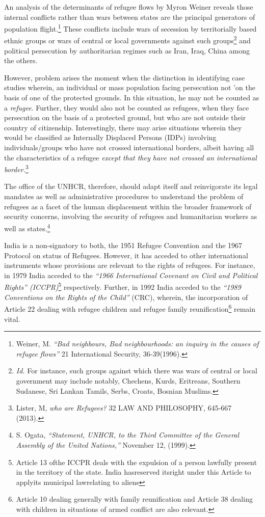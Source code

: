 \begin{multicols}{2}
\noi
An analysis of the determinants of refugee flows by Myron Weiner reveals those internal
conflicts rather than wars between states are the principal generators of population
flight.\footnote{Weiner, M. \textit{“Bad neighbours, Bad neighbourhoods: an inquiry in the causes of refugee flows”} 21
International Security, 36-39(1996).} These conflicts include wars of secession by territorially based ethnic groups or wars
of central or local governments against such groups\footnote{\textit{Id.} For instance, such groups against which there was wars of central or local government may include notably, Chechens, Kurds, Eritreans, Southern Sudanese, Sri Lankan Tamils, Serbs, Croats, Bosnian Muslims. } and political persecution by authoritarian regimes such as Iran, Iraq, China among the others.

\noi
However, problem arises the moment when the distinction in identifying case studies wherein,
an individual or mass population facing persecution not 'on the basis of one of the protected
grounds. In this situation, he may not be counted as a \textit{refugee}. Further, they would also not be
counted as refugees, when they face persecution on the basis of a protected ground, but who
are not outside their country of citizenship. Interestingly, there may arise situations wherein
they would be classified as Internally Displaced Persons (IDPs) involving individuals/groups
who have not crossed international borders, albeit having all the characteristics of a refugee
\textit{except that they have not crossed an international border.}\footnote{Lister, M, \textit{who are Refugees?} 32 LAW AND PHILOSOPHY, 645-667 (2013).}

\noi
The office of the UNHCR, therefore, should adapt itself and reinvigorate its legal mandates as
well as administrative procedures to understand the problem of refugees as a facet of the
human displacement within the broader framework of security concerns, involving the
security of refugees and humanitarian workers as well as states.\footnote{S. Ogata, \textit{“Statement, UNHCR, to the Third Committee of the General Assembly of the United Nations,”} November 12, (1999).}


\noi
India is a non-signatory to both, the 1951 Refugee Convention and the 1967 Protocol on
status of Refugees. However, it has acceded to other international instruments whose
provisions are relevant to the rights of refugees. For instance, in 1979 India acceded to the
\textit{“1966 International Covenant on Civil and Political Rights” (ICCPR)}\footnote{Article 13 ofthe ICCPR deals with the expulsion of a person lawfully present in the territory of the state. India hasreserved itsright under this Article to applyits municipal lawrelating to aliens} respectively. Further, in 1992 India acceded to the \textit{“1989 Conventions on the Rights of the Child”} (CRC), wherein, the incorporation of Article 22 dealing with refugee children and refugee family reunification\footnote{Article 10 dealing generally with family reunification and Article 38 dealing with children in situations of armed conflict are also relevant.} remain vital.


\end{multicols}

